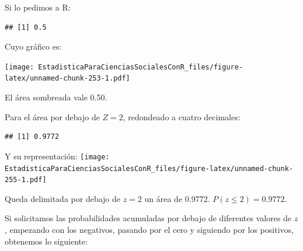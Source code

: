 \documentclass[]{book}
\begin{document}
Si lo pedimos a R:

\begin{verbatim}
## [1] 0.5
\end{verbatim}

Cuyo gráfico es:

\texttt{[image: EstadisticaParaCienciasSocialesConR\_files/figure-latex/unnamed-chunk-253-1.pdf]}

El área sombreada vale 0.50.

Para el área por debajo de \(Z=2\), redondeado a cuatro decimales:

\begin{verbatim}
## [1] 0.9772
\end{verbatim}

Y su representación:
\texttt{[image: EstadisticaParaCienciasSocialesConR\_files/figure-latex/unnamed-chunk-255-1.pdf]}

Queda delimitada por debajo de \(z=2\) un área de 0.9772. \(P(z\leq2)=0.9772\).

Si solicitamos las probabilidades acumuladas por debajo de diferentes valores de \(z\), empezando con los negativos, pasando por el cero y siguiendo por los positivos, obtenemos lo siguiente:
\end{document}
